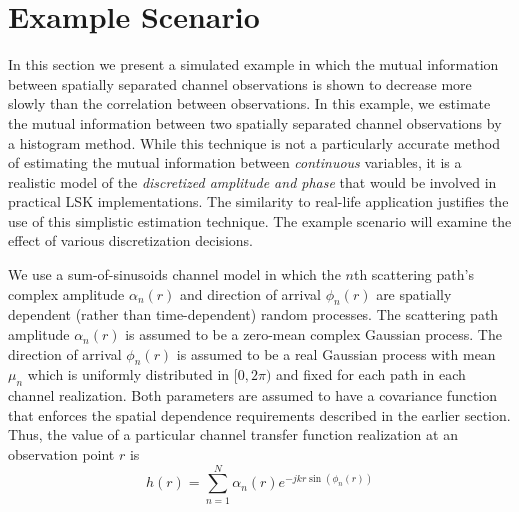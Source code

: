 \documentclass[journal]{IEEEtran}
\begin{document}
\section{Example Scenario}
In this section we present a simulated example in which the mutual information between spatially separated channel observations is shown to decrease more slowly than the correlation between observations.  In this example, we estimate the mutual information between two spatially separated channel observations by a histogram method. While this technique is not a particularly accurate method of estimating the mutual information between \emph{continuous} variables, it is a realistic model of the \emph{discretized amplitude and phase} that would be involved in practical LSK implementations.  The similarity to real-life application justifies the use of this simplistic estimation technique.  The example scenario will examine the effect of various discretization decisions.

We use a sum-of-sinusoids channel model in which the $n$th scattering path's complex amplitude $\alpha_n(r)$ and direction of arrival $\phi_n(r)$ are spatially dependent (rather than time-dependent) random processes.  The scattering path amplitude $\alpha_n(r)$ is assumed to be a zero-mean complex Gaussian process.  The direction of arrival $\phi_n(r)$ is assumed to be a real Gaussian process with mean $\mu_n$ which is uniformly distributed in $[0, 2\pi)$ and fixed for each path in each channel realization.  Both parameters are assumed to have a covariance function that enforces the spatial dependence requirements described in the earlier section.  Thus, the value of a particular channel transfer function realization at an observation point $r$ is
\begin{equation}
h(r) = \sum_{n=1}^N \alpha_n(r) e^{-jkr\sin(\phi_n(r))}
\end{equation}
\end{document}
